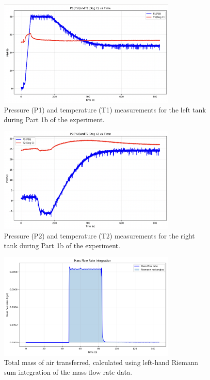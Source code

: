 \documentclass[12pt]{article}
\begin{document}
\begin{figure}[h!]
\centering
\includegraphics[width=0.8\textwidth]{1b-left_tank.png}
\caption{Pressure (P1) and temperature (T1) measurements for the left tank during Part 1b of the experiment.}
\label{fig:tank1_data_b}
\end{figure}

\begin{figure}[h!]
\centering
\includegraphics[width=0.8\textwidth]{1b-right_tank.png}
\caption{Pressure (P2) and temperature (T2) measurements for the right tank during Part 1b of the experiment.}
\label{fig:tank2_data_b}
\end{figure}

\begin{figure}[h!]
\centering
\includegraphics[width=0.8\textwidth]{massintegration.png}
\caption{Total mass of air transferred, calculated using left-hand Riemann sum integration of the mass flow rate data.}
\label{fig:massintegration}
\end{figure}
\end{document}
